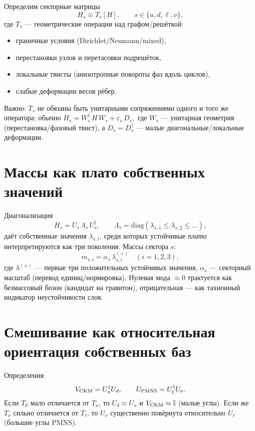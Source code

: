 \documentclass[12pt,a4paper]{article}
\begin{document}
Определим секторные матрицы
\begin{equation}
H_s \equiv T_s[H], \qquad s\in\{u,d,\ell,\nu\},
\end{equation}
где $T_s$ — геометрические операции над графом/решёткой: 
\begin{itemize}
\item граничные условия (Dirichlet/Neumann/mixed),
\item перестановки узлов и перетасовки подрешёток,
\item локальные твисты (анизотропные повороты фаз вдоль циклов),
\item слабые деформации весов рёбер.
\end{itemize}
\noindent
Важно: $T_s$ не обязаны быть унитарными сопряжениями одного и того же оператора; обычно
\(
H_s = W_s^\dagger\, H\, W_s + \varepsilon_s\, D_s,
\)
где $W_s$ — унитарная геометрия (перестановка/фазовый твист), а $D_s=D_s^\dagger$ — малые диагональные/локальные деформации. 

\section{Массы как плато собственных значений}
Диагонализация
\begin{equation}
H_s = U_s\,\Lambda_s\, U_s^\dagger,\qquad 
\Lambda_s=\mathrm{diag}(\lambda_{s,1}\le\lambda_{s,2}\le\ldots),
\end{equation}
даёт собственные значения $\lambda_{s,i}$, среди которых устойчивые \emph{плато} интерпретируются как три поколения. Массы сектора $s$:
\begin{equation}
m_{s,i} = \alpha_s\, \lambda_{s,i}^{(+)}\quad (i=1,2,3),
\end{equation}
где $\lambda^{(+)}$ — первые три положительных устойчивых значения, $\alpha_s$ — секторный масштаб (перевод единиц/нормировка). Нулевая мода $\approx 0$ трактуется как безмассовый бозон (кандидат на гравитон), отрицательная — как тахионный индикатор неустойчивости слоя.

\section{Смешивание как относительная ориентация собственных баз}
Определения:
\begin{equation}
V_{\rm CKM} = U_u^\dagger U_d,\qquad U_{\rm PMNS}=U_\ell^\dagger U_\nu.
\end{equation}
Если $T_d$ мало отличается от $T_u$, то $U_d \approx U_u$ и $V_{\rm CKM}\approx \mathbb{I}$ (малые углы). Если же $T_\nu$ сильно отличается от $T_\ell$, то $U_\nu$ существенно повёрнута относительно $U_\ell$ (большие углы PMNS).
\end{document}
